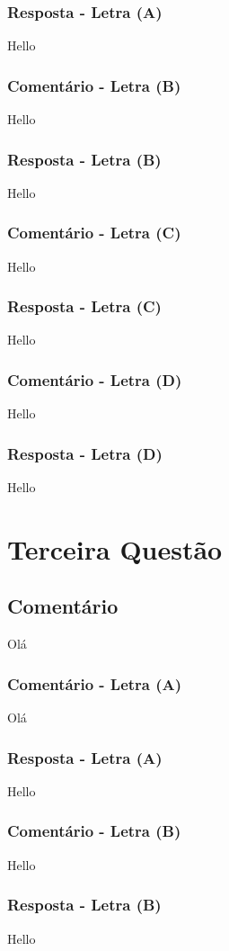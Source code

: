 \documentclass[12pt, a4paper]{article}
\begin{document}
		\subsubsection{Resposta - Letra (A)}
			Hello
		\subsubsection{Comentário - Letra (B)}
			Hello
		\subsubsection{Resposta - Letra (B)}
			Hello
		\subsubsection{Comentário - Letra (C)}
			Hello	
		\subsubsection{Resposta - Letra (C)}
			Hello
		\subsubsection{Comentário - Letra (D)}
			Hello	
		\subsubsection{Resposta - Letra (D)}
			Hello
\section{Terceira Questão}
	\subsection{Comentário}
		Olá
		\subsubsection{Comentário - Letra (A)}
			Olá
		\subsubsection{Resposta - Letra (A)}
			Hello
		\subsubsection{Comentário - Letra (B)}
			Hello
		\subsubsection{Resposta - Letra (B)}
			Hello
\end{document}
